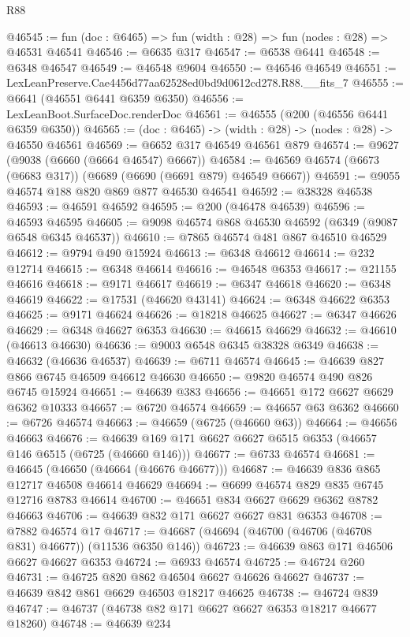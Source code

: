 \begin{lexlean}{R88}
\begin{coremodule}
@46545 := fun (doc : @6465) => fun (width : @28) => fun (nodes : @28) => @46531 @46541
@46546 := @6635 @317
@46547 := @6538 @6441
@46548 := @6348 @46547
@46549 := @46548 @9604
@46550 := @46546 @46549
@46551 := LexLeanPreserve.Cae4456d77aa62528ed0bd9d0612cd278.R88.__fits_7
@46555 := @6641 (@46551 @6441 @6359 @6350)
@46556 := LexLeanBoot.SurfaceDoc.renderDoc
@46561 := @46555 (@200 (@46556 @6441 @6359 @6350))
@46565 := (doc : @6465) -> (width : @28) -> (nodes : @28) -> @46550 @46561
@46569 := @6652 @317 @46549 @46561 @879
@46574 := @9627 (@9038 (@6660 (@6664 @46547) @6667))
@46584 := @46569 @46574 (@6673 (@6683 @317)) (@6689 (@6690 (@6691 @879) @46549 @6667))
@46591 := @9055 @46574 @188 @820 @869 @877 @46530 @46541
@46592 := @38328 @46538
@46593 := @46591 @46592
@46595 := @200 (@46478 @46539)
@46596 := @46593 @46595
@46605 := @9098 @46574 @868 @46530 @46592 (@6349 (@9087 @6548 @6345 @46537))
@46610 := @7865 @46574 @481 @867 @46510 @46529
@46612 := @9794 @490 @15924
@46613 := @6348 @46612
@46614 := @232 @12714
@46615 := @6348 @46614
@46616 := @46548 @6353
@46617 := @21155 @46616
@46618 := @9171 @46617
@46619 := @6347 @46618
@46620 := @6348 @46619
@46622 := @17531 (@46620 @43141)
@46624 := @6348 @46622 @6353
@46625 := @9171 @46624
@46626 := @18218 @46625
@46627 := @6347 @46626
@46629 := @6348 @46627 @6353
@46630 := @46615 @46629
@46632 := @46610 (@46613 @46630)
@46636 := @9003 @6548 @6345 @38328 @6349
@46638 := @46632 (@46636 @46537)
@46639 := @6711 @46574
@46645 := @46639 @827 @866 @6745 @46509 @46612 @46630
@46650 := @9820 @46574 @490 @826 @6745 @15924
@46651 := @46639 @383
@46656 := @46651 @172 @6627 @6629 @6362 @10333
@46657 := @6720 @46574
@46659 := @46657 @63 @6362
@46660 := @6726 @46574
@46663 := @46659 (@6725 (@46660 @63))
@46664 := @46656 @46663
@46676 := @46639 @169 @171 @6627 @6627 @6515 @6353 (@46657 @146 @6515 (@6725 (@46660 @146)))
@46677 := @6733 @46574
@46681 := @46645 (@46650 (@46664 (@46676 @46677)))
@46687 := @46639 @836 @865 @12717 @46508 @46614 @46629
@46694 := @6699 @46574 @829 @835 @6745 @12716 @8783 @46614
@46700 := @46651 @834 @6627 @6629 @6362 @8782 @46663
@46706 := @46639 @832 @171 @6627 @6627 @831 @6353
@46708 := @7882 @46574 @17
@46717 := @46687 (@46694 (@46700 (@46706 (@46708 @831) @46677)) (@11536 @6350 @146))
@46723 := @46639 @863 @171 @46506 @6627 @46627 @6353
@46724 := @6933 @46574
@46725 := @46724 @260
@46731 := @46725 @820 @862 @46504 @6627 @46626 @46627
@46737 := @46639 @842 @861 @6629 @46503 @18217 @46625
@46738 := @46724 @839
@46747 := @46737 (@46738 @82 @171 @6627 @6627 @6353 @18217 @46677 @18260)
@46748 := @46639 @234

\end{coremodule}
\end{lexlean}
